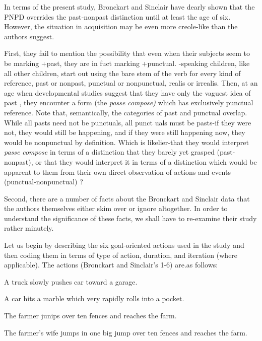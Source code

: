 
In terms of the present study, Bronckart and Sinclair have dearly shown that the PNPD overrides the past-nonpast distinction until at least the age of six. However, the situation in  acquisi\-tion may be even more creole-like than the authors suggest.

First, they fail to mention the possibility that even when their subjects seem to be marking +past, they are in fuct marking +punctual. -speaking children, like all other children, start out using the bare stem of the verb for every kind of reference, past or nonpast, punctual or nonpunctual, realis or irrealis. Then, at an age when devel\-opmental studies suggest that they have only the vaguest idea of past , they encounter a form (the \textit{passe} \textit{compos}\textit{e}\textit{)} which has exclusively punctual reference. Note that, semantically, the categories of past and punctual overlap. While all pasts need not be punctuals, all punct uals must be pasts-if they were not, they would still be happening, and if they were still happening now, they would be nonpunctual by defini\-tion. Which is likelier-that they would interpret \textit{passe} \textit{compose} in terms of a distinction that they barely yet grasped (past-nonpast), or that they would interpret it in terms of a distinction which would be apparent to them from their own direct observation of actions and events (punctual-nonpunctual) ?

Second, there are a number of facts about the Bronckart and Sinclair data that the authors themselves either skim over or ignore altogether. In order to understand the significance of these facts, we shall have to re-examine their study rather minutely.

Let us begin by describing the six goal-oriented actions used in the study and then coding them in terms of type of action, duration, and iteration (where applicable). The actions (Bronckart and Sinclair's 1{}-6) are.as follows:

\ea\label{ex:16}
 A truck slowly pushes car toward a garage.
\glt
\z

\ea\label{ex:17}
 A car hits a marble which very rapidly rolls into a pocket.
\glt
\z

\ea\label{ex:18}
 The farmer junips over ten fences and reaches the farm.
\glt
\z

\ea\label{ex:19}
 The farmer's wife jumps in one big jump over ten fences and reaches the farm.
\glt
\z

